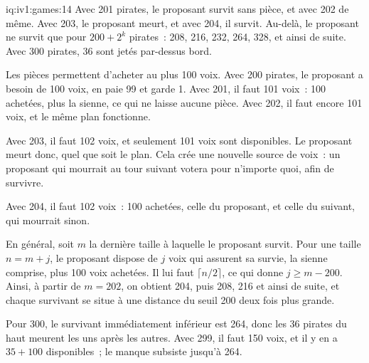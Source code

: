 \begin{solution}{iq:iv1:games:14}
Avec 201 pirates, le proposant survit sans pièce, et avec 202 de même. Avec 203, le proposant meurt, et avec 204, il survit. Au-delà, le proposant ne survit que pour $200 + 2^k$ pirates~: 208, 216, 232, 264, 328, et ainsi de suite. Avec 300 pirates, 36 sont jetés par-dessus bord.

Les pièces permettent d'acheter au plus 100 voix. Avec 200 pirates, le proposant a besoin de 100 voix, en paie 99 et garde 1. Avec 201, il faut 101 voix~: 100 achetées, plus la sienne, ce qui ne laisse aucune pièce. Avec 202, il faut encore 101 voix, et le même plan fonctionne.

Avec 203, il faut 102 voix, et seulement 101 voix sont disponibles. Le proposant meurt donc, quel que soit le plan. Cela crée une nouvelle source de voix~: un proposant qui mourrait au tour suivant votera pour n'importe quoi, afin de survivre.

Avec 204, il faut 102 voix~: 100 achetées, celle du proposant, et celle du suivant, qui mourrait sinon.

En général, soit $m$ la dernière taille à laquelle le proposant survit. Pour une taille $n = m + j$, le proposant dispose de $j$ voix qui assurent sa survie, la sienne comprise, plus 100 voix achetées. Il lui faut $\lceil n/2 \rceil$, ce qui donne $j \ge m - 200$. Ainsi, à partir de $m = 202$, on obtient 204, puis 208, 216 et ainsi de suite, et chaque survivant se situe à une distance du seuil 200 deux fois plus grande.

Pour 300, le survivant immédiatement inférieur est 264, donc les 36 pirates du haut meurent les uns après les autres. Avec 299, il faut 150 voix, et il y en a $35 + 100$ disponibles~; le manque subsiste jusqu'à 264.

\end{solution}

